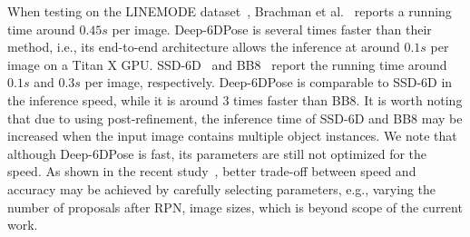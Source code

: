\documentclass[conference]{IEEEtran}
\newcommand{\method}[1]{Deep-6DPose}
\begin{document}
When testing on the LINEMODE dataset~\cite{ACCV12}, Brachman {{et al.}}~\cite{CVPR16} reports a running time around $0.45s$ per image. \method{} is several times faster than their method, i.e., its end-to-end architecture allows the inference at around $0.1s$ per image on a Titan X GPU. SSD-6D~\cite{SSD-6D} and BB8~\cite{BB8} report the running time around $0.1s$ and $0.3s$ per image, respectively. \method{} is comparable to SSD-6D in the inference speed, while it is around 3 times faster than BB8. It is worth noting that due to using post-refinement, the inference time of SSD-6D and BB8 may be increased when the input image contains multiple object instances. We note that although \method{} is fast, its parameters are still not optimized for the speed.  %
 As shown in the recent study~\cite{DBLP:journals/corr/HuangRSZKFFWSG016}, better trade-off between speed and accuracy may be achieved by carefully selecting parameters, e.g., varying the number of proposals after RPN, image sizes, which is beyond scope of the current work. 







\end{document}
